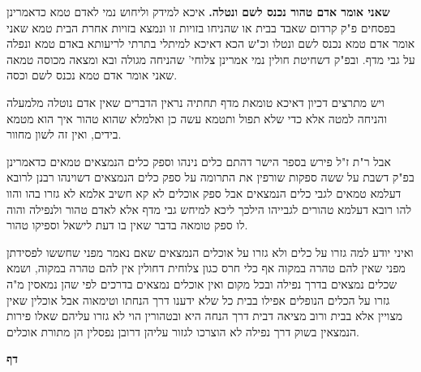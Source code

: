 \documentclass[12pt, openany]{book}
\newcommand{\sethebfont}{
\fontsize{10.5pt}{21.0pt} \selectfont
}
\newcommand{\twocol}[1]{
	{\sethebfont \begin{multicols}{2}
			#1
	\end{multicols}}	
}
\newcommand{\chapname}{}
\newcommand{\newchap}[1]{
	\addcontentsline{toc}{chapter}{#1}
	\renewcommand{\chapname}{#1}
		\begin{center}
			\textbf{%
\fontsize{16pt}{16pt}\selectfont
				#1}
		\end{center}
}
\begin{document}
\twocol{\textbf{שאני אומר אדם טהור נכנס לשם ונטלה.}  איכא למידק וליחוש נמי לאדם טמא כדאמרינן בפסחים פ"ק קרדום שאבד בבית או שהניחו בזויות זו ונמצא בזויות אחרת הבית טמא שאני אומר אדם טמא נכנס לשם ונטלו וכ"ש הכא דאיכא למיתלי בתרתי לריעותא באדם טמא ונפלה על גבי מדף. ובפ"ק דשחיטת חולין נמי אמרינן צלוחי' שהניחה מגולה ובא ומצאה מכוסה טמאה שאני אומר אדם טמא נכנס לשם וכסה.\par  ויש מתרצים דכיון דאיכא טומאת מדף תחתיה נראין הדברים שאין אדם נוטלה מלמעלה והניחה למטה אלא כדי שלא תפול ותטמא עשה כן ואלמלא שהוא טהור איך הוא מטמא בידים, ואין זה לשון מחוור.\par אבל ר"ת ז"ל פירש בספר הישר דהתם כלים נינהו וספק כלים הנמצאים טמאים כדאמרינן בפ"ק דשבת על ששה ספקות שורפין את התרומה על ספק כלים הנמצאים דשוינהו רבנן לרובא דעלמא טמאים לגבי כלים הנמצאים אבל ספק אוכלים לא קא חשיב אלמא לא גזרו בהו והוו להו רובא דעלמא טהורים לגבייהו הילכך ליכא למיחש גבי מדף אלא לאדם טהור ולנפילה והוה לו ספק טומאה בדבר שאין בו דעת לישאל וספיקו טהור.\par  ואיני יודע למה גזרו על כלים ולא גזרו על אוכלים הנמצאים שאם נאמר מפני שחששו לפסידתן מפני שאין להם טהרה במקוה אף כלי חרס כגון צלוחית דחולין אין להם טהרה במקוה, ושמא שכלים נמצאים בדרך נפילה ובכל מקום ואין אוכלים נמצאים בדרכים לפי שהן נמאסין מ"ה גזרו על הכלים הנופלים אפילו בבית כל שלא ידענו דרך הנחתו וטימאוה אבל אוכלין שאין מצויין אלא בבית ורוב מציאה דבית דרך הנחה היא ובטהורין הוי לא גזרו עליהם שאלו פירות הנמצאין בשוק דרך נפילה לא הוצרכו לגזור עליהן דרובן נפסלין הן מתורת אוכלים. 
\par}
\newchap{דף }
\end{document}

